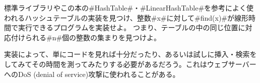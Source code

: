 \begin{exc}
標準ライブラリやこの本の#HashTable#・#LinearHashTable#を参考によく使われるハッシュテーブルの実装を見つけ、整数#x#に対して#find(x)#が線形時間で実行できるプログラムを実装せよ。
つまり、テーブルの中の同じ位置に対応付けられる#n#個の整数の集まりを見つけよ。

実装によって、単にコードを見れば十分だったり、あるいは試しに挿入・検索をしてみてその時間を測ってみたりする必要があるだろう。これはウェブサーバーへのDoS (denial of service)攻撃に使われることがある。\cite{cw03}
%
\end{exc}
